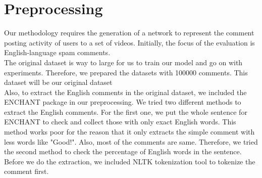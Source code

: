 \documentclass [a4paper, 11pt, oneside, final]{article}
\numberwithin{equation}{section}		%
\numberwithin{figure}{section}			%
\numberwithin{table}{section}				%
\begin{document}
\section{Preprocessing}
Our methodology requires the generation of a network to represent the comment posting activity of users to a set of videos.  Initially, the focus of the evaluation is English-language spam comments. \\

The original dataset is way to large for us to train our model and go on with experiments. Therefore, we prepared the datasets with 100000 comments. This  dataset will be our original dataset\\

Also, to extract the English comments in the original dataset, we included the ENCHANT package in our preprocessing. We tried two different methods to extract the English comments. For the first one, we put the whole sentence for ENCHANT to check and collect those with only exact English words. This method works poor for the reason that it only extracts the simple comment with less words like "Good!". Also, most of the comments are same. Therefore, we tried the second method to check the percentage of English words in the sentence. Before we do the extraction, we included NLTK tokenization tool to tokenize the comment first.
\end{document}
